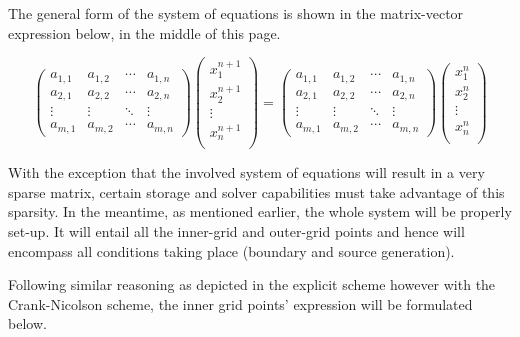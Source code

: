 \documentclass[a4paper,10pt]{IEEEtran}
\begin{document}
	The general form of the system of equations is shown in the matrix-vector expression below, in the middle of this page.

	\begin{strip}
	\begin{equation}
		\begin{pmatrix}
		a_{1,1} & a_{1,2} & \cdots & a_{1,n} \\
		a_{2,1} & a_{2,2} & \cdots & a_{2,n} \\
		\vdots  & \vdots  & \ddots & \vdots \\
		a_{m,1} & a_{m,2} & \cdots & a_{m,n}
		\end{pmatrix}
		\begin{pmatrix}
		x_1^{n+1} \\
		x_2^{n+1} \\
		\vdots    \\
		x_n^{n+1} \\
		\end{pmatrix}
		= 
		\begin{pmatrix}
		a_{1,1} & a_{1,2} & \cdots & a_{1,n} \\
		a_{2,1} & a_{2,2} & \cdots & a_{2,n} \\
		\vdots  & \vdots  & \ddots & \vdots \\
		a_{m,1} & a_{m,2} & \cdots & a_{m,n}
		\end{pmatrix}
		\begin{pmatrix}
		x_1^{n} \\
		x_2^{n} \\
		\vdots    \\
		x_n^{n} \\
		\end{pmatrix}
	\end{equation}
	\end{strip}
	With the exception that the involved system of equations will result in a very sparse matrix, certain storage and solver capabilities must take advantage of this sparsity. In the meantime, as mentioned earlier, the whole system will be properly set-up. It will entail all the inner-grid and outer-grid points and hence will encompass all conditions taking place (boundary and source generation). 
	
	Following similar reasoning as depicted in the explicit scheme however with the Crank-Nicolson scheme, the inner grid points' expression will be formulated below. 
	
\end{document}

